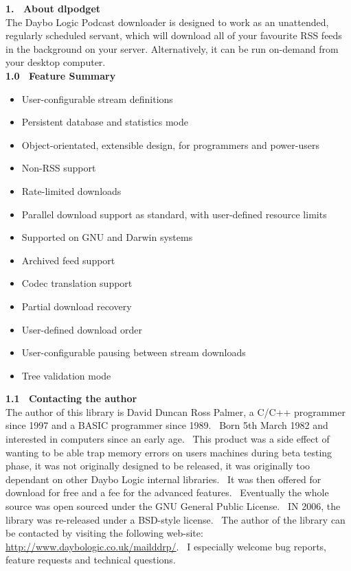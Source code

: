 \documentclass{article}
\begin{document}
\newpage
\textbf{1.~ About dlpodget}
\\
The Daybo Logic Podcast downloader is designed to work as an unattended, regularly scheduled servant, which
will download all of your favourite RSS feeds in the background on your server.  Alternatively, it can be run
on-demand from your desktop computer.
\\
\textbf{1.0~ Feature Summary}
\begin{itemize}
\item User-configurable stream definitions
\item Persistent database and statistics mode
\item Object-orientated, extensible design, for programmers and power-users
\item Non-RSS support
\item Rate-limited downloads
\item Parallel download support as standard, with user-defined resource limits
\item Supported on GNU and Darwin systems
\item Archived feed support
\item Codec translation support
\item Partial download recovery
\item User-defined download order
\item User-configurable pausing between stream downloads
\item Tree validation mode
\end{itemize}
\textbf{1.1~ Contacting the author}
\\
The author of this library is David Duncan Ross Palmer, a C/C++
programmer
since 1997 and a BASIC programmer since 1989.~ Born 5th March 1982
and interested in computers since an early age.~ This product was
a side effect of wanting to be able trap memory errors on users
machines
during beta testing phase, it was not originally designed to be
released,
it was originally too dependant on other Daybo Logic internal
libraries.~
It was then offered for download for free and a fee for the advanced
features.~
Eventually the whole source was open sourced under the GNU General
Public
License.~ IN 2006, the library was re-released under a BSD-style
license.~ The author of the library can be contacted by visiting
the following web-site: \href{http://www.daybologic.co.uk/mailddrp/}{\url{http://www.daybologic.co.uk/mailddrp/}}.~
I especially welcome bug reports, feature requests and technical
questions.\\
\end{document}
